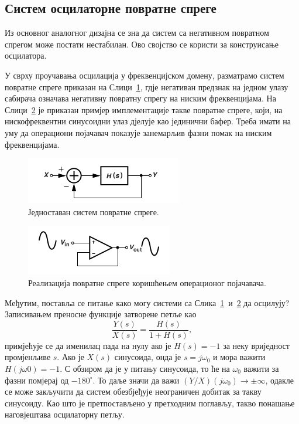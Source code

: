 \documentclass[master]{finthesis}
\begin{document}
\subsection{Систем осцилаторне повратне спреге}
Из основног аналогног дизајна се зна да систем са негативном повратном спрегом може постати нестабилан. Ово својство се користи за конструисање осцилатора. \par
У сврху проучавања осцилација у фреквенцијском домену, разматрамо систем повратне спреге приказан на Слици~\ref{osc_feedback_1}, гдје негативан предзнак на једном улазу сабирача означава негативну повратну спрегу на ниским фреквенцијама. На Слици~\ref{osc_feedback_2} је приказан примјер имплементације такве повратне спреге, који, на нискофреквентни синусоидни улаз дјелује као јединични бафер. Треба имати на уму да операциони појачавач показује занемарљив фазни помак на ниским фреквенцијама. \par
\begin{figure}[!ht]
	 \centering
	 \includegraphics[scale=0.8]{slike/osc_feedback_1.png}
 	 \caption{Једноставан систем повратне спреге.}
	 \label{osc_feedback_1}
\end{figure}
\begin{figure}[!ht]
	 \centering
	 \includegraphics[scale=0.8]{slike/osc_feedback_2.png}
 	 \caption{Реализација повратне спреге коришћењем операционог појачавача.}
	 \label{osc_feedback_2}
\end{figure}
Међутим, поставља се питање како могу системи са Слика~\ref{osc_feedback_1}~и~\ref{osc_feedback_2} да осцилују? Записивањем преносне функције затворене петље као 
\begin{equation} 
	\label{transfer_function}
	\frac{Y(s)}{X(s)}=\frac{H(s)}{1+H(s)},
\end{equation}
примјећује се да именилац пада на нулу ако је $H(s)=-1$ за неку вриједност промјенљиве $s$. Ако је $X(s)$ синусоида, онда је $s=j\omega_{0}$ и мора важити $H(j\omega{0})=-1$. С обзиром да је у питању синусоида, то ће на $\omega_{0}$ важити за фазни помјерај од $-180^{\circ}$. То даље значи да важи $(Y/X)(j\omega_{0}) \rightarrow \pm\infty$, одакле се може закључити да систем обезбјеђује неограничен добитак за такву синусоиду. Као што је претпостављено у претходним поглављу, такво понашање наговјештава осцилаторну петљу. \par
\end{document}
